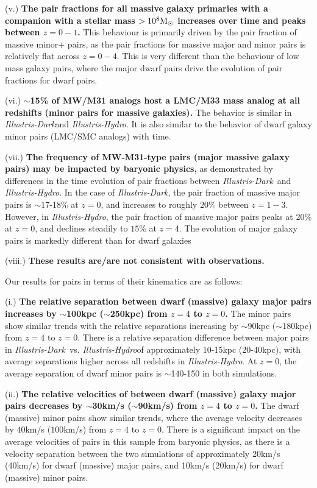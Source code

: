 \documentclass[twocolumn]{aastex63}
\newcommand\msun{\rm{M}_{\odot}}
\newcommand\ID{\textit{Illustris-Dark}}
\newcommand\IH{\textit{Illustris-Hydro}}
\begin{document}
(v.) \textbf{The pair fractions for all massive galaxy primaries with a companion with a stellar mass $>10^8 \msun$ increases over time and peaks between $z=0-1$.} This behaviour is primarily driven by the pair fraction of massive minor+ pairs, as the pair fractions for massive major and minor pairs is relatively flat across $z=0-4$. This is very different than the behaviour of low mass galaxy pairs, where the major dwarf pairs drive the evolution of pair fractions for dwarf pairs.

(vi.) \textbf{$\sim$15\% of MW/M31 analogs host a LMC/M33 mass analog at all redshifts (minor pairs for massive galaxies).}  The behavior is similar in \ID and \IH. It is also similar to the behavior of dwarf galaxy minor pairs (LMC/SMC analogs) with time. %

(vii.) \textbf{The frequency of MW-M31-type pairs (major massive galaxy pairs) may be impacted by baryonic physics,} as demonstrated by differences in the time evolution of pair fractions between \ID\ and \IH. In the case of \ID, the pair fraction of massive major pairs is $\sim$17-18\% at $z=0$, and increases to roughly $20\%$ between $z=1-3$. However, in \IH, the pair fraction of massive major pairs peaks at 20\% at $z=0$, and declines steadily to $15\%$ at $z=4$. The evolution of major galaxy pairs is markedly different than for dwarf galaxies 

(viii.) \textbf{These results are/are not consistent with observations.}

Our results for pairs in terms of their kinematics are as follows:

(i.) \textbf{The relative separation between dwarf (massive) galaxy major pairs increases by $\sim$100kpc ($\sim$250kpc) from $z=4$ to $z=0$.} The minor pairs show similar trends with the relative separations increasing by $\sim$90kpc ($\sim$180kpc) from $z=4$ to $z=0$. There is a relative separation difference between major pairs in \ID\ vs. \IH of approximately 10-15kpc (20-40kpc), with average separations higher across all redshifts in \IH. At $z=0$, the average separation of dwarf minor pairs is $\sim$140-150 in both simulations. 

(ii.) \textbf{The relative velocities of between dwarf (massive) galaxy major pairs decreases by $\sim$30km/s ($\sim$90km/s) from $z=4$ to $z=0$.} The dwarf (massive) minor pairs show similar trends, where the average velocity decreases by $40$km/s ($100$km/s) from $z=4$ to $z=0$. There is a significant impact on the average velocities of pairs in this sample from baryonic physics, as there is a velocity separation between the two simulations of approximately $20$km/s (40km/s) for dwarf (massive)  major pairs, and 10km/s (20km/s) for dwarf (massive) minor pairs. 
\end{document}
